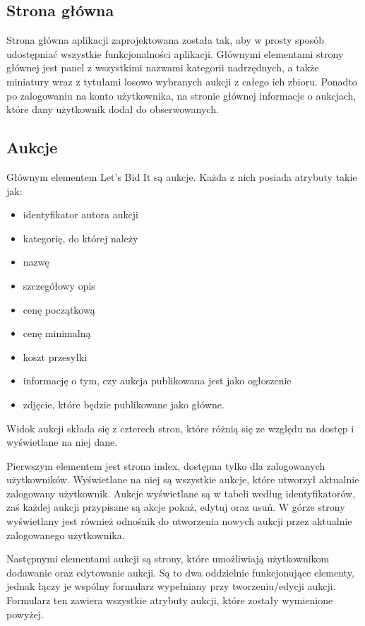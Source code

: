 \documentclass[brudnopis]{xmgr}
\begin{document}
\subsection{Strona główna}

Strona główna aplikacji zaprojektowana została tak, aby w prosty sposób udostępniać wszystkie funkcjonalności aplikacji. Głównymi elementami strony głównej jest panel z wszystkimi nazwami kategorii nadrzędnych, a także miniatury wraz z tytułami losowo wybranych aukcji z całego ich zbioru. Ponadto po zalogowaniu na konto użytkownika, na stronie głównej informacje o aukcjach, które dany użytkownik dodał do obserwowanych.

\subsection{Aukcje}

Głównym elementem Let's Bid It są aukcje. Każda z nich posiada atrybuty takie jak:
\begin{itemize}

\item identyfikator autora aukcji
\item kategorię, do której należy
\item nazwę
\item szczegółowy opis
\item cenę początkową
\item cenę minimalną
\item koszt przesyłki
\item informację o tym, czy aukcja publikowana jest jako ogłoszenie
\item zdjęcie, które będzie publikowane jako główne.

\end{itemize}

Widok aukcji składa się z czterech stron, które różnią się ze względu na dostęp i wyświetlane na niej dane.

Pierwszym elementem jest strona index, dostępna tylko dla zalogowanych użytkowników. Wyświetlane na niej są wszystkie aukcje, które utworzył aktualnie zalogowany użytkownik. Aukcje wyświetlane są w tabeli według identyfikatorów, zaś każdej aukcji przypisane są akcje pokaż, edytuj oraz usuń. W górze strony wyświetlany jest również odnośnik do utworzenia nowych aukcji przez aktualnie zalogowanego użytkownika.

Następnymi elementami aukcji są strony, które umożliwiają użytkownikom dodawanie oraz edytowanie aukcji. Są to dwa oddzielnie funkcjonujące elementy, jednak łączy je wspólny formularz wypełniany przy tworzeniu/edycji aukcji. Formularz ten zawiera wszystkie atrybuty aukcji, które zostały wymienione powyżej.
\end{document}
